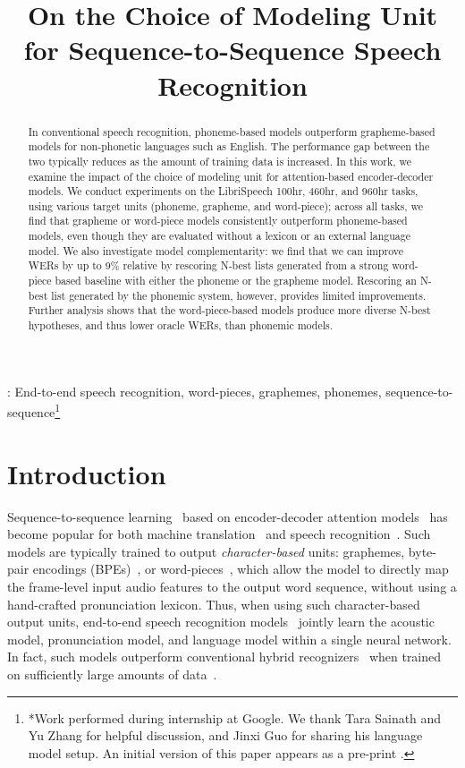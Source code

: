 \title{On the Choice of Modeling Unit for Sequence-to-Sequence Speech Recognition}



\maketitle
\begin{abstract}
In conventional speech recognition, phoneme-based models
outperform grapheme-based models for non-phonetic languages such as English.
The performance gap between the two typically reduces as the amount of training data
is increased.
In this work, we examine the impact of the choice of modeling unit for
attention-based encoder-decoder models.
We conduct experiments on the LibriSpeech 100hr, 460hr, and 960hr tasks, using
various target units (phoneme, grapheme, and word-piece);
across all tasks, we find that grapheme or word-piece models consistently
outperform phoneme-based models, even though they are evaluated without a
lexicon or an external language model.
We also investigate model complementarity: we find that we can improve WERs by up to 9\% relative by
rescoring N-best lists generated from a strong word-piece based baseline with either the
phoneme or the grapheme model.
Rescoring an N-best list generated by the phonemic system, however, provides
limited improvements.
Further analysis shows that the word-piece-based models produce more diverse
N-best hypotheses, and thus lower oracle WERs, than phonemic models.
\end{abstract}
:
End-to-end speech recognition, word-pieces, graphemes, phonemes, sequence-to-sequence\let\thefootnote\relax\footnote{*Work performed during internship at Google.
We thank Tara Sainath and Yu Zhang for helpful discussion,
and Jinxi Guo for sharing his language model setup.
An initial version of this paper appears as a pre-print \cite{irie2019}.}
\addtocounter{footnote}{-1}\let\thefootnote\svthefootnote
\vspace{-2mm}
\section{Introduction}
\label{sec:intro}
Sequence-to-sequence learning~\cite{seq2seq} based on encoder-decoder attention
models~\cite{bahdanau2014neural} has become popular for both machine
translation~\cite{wu2016google} and speech recognition~\cite{RPis2017,
KimHW17, battenberg2017exploring, WengCWWYSY18, ChiuSWPNCKWRGJL18}.
Such models are typically trained to output \emph{character-based} units:
graphemes, byte-pair encodings (BPEs)~\cite{sennrich16bpe}, or
word-pieces~\cite{SchusterN12}, which allow the model to directly map
the frame-level input audio features to the
output word sequence, without using a hand-crafted pronunciation lexicon.
Thus, when using such character-based output units, end-to-end speech
recognition models~\cite{lasicassp2016} jointly learn the acoustic model,
pronunciation model, and language model within a single neural network.
In fact, such models outperform conventional hybrid recognizers~\cite{Bourlard1993} when trained on
sufficiently large amounts of data~\cite{ChiuSWPNCKWRGJL18}.

